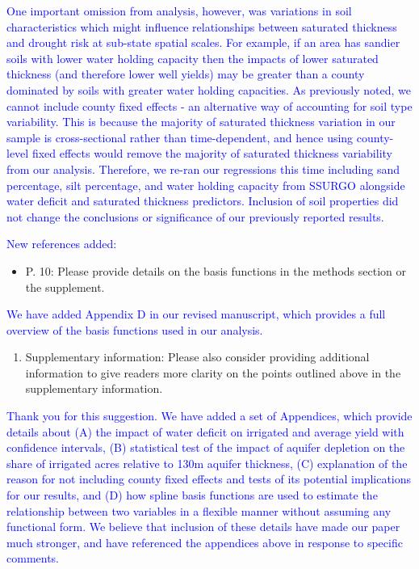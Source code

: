 \documentclass[
]{article}
\providecommand{\tightlist}{%
  \setlength{\itemsep}{0pt}\setlength{\parskip}{0pt}}
\begin{document}
\textcolor{blue}{One important omission from analysis, however, was variations in soil characteristics which might influence relationships between saturated thickness and drought risk at sub-state spatial scales. For example, if an area has sandier soils with lower water holding capacity then the impacts of lower saturated thickness (and therefore lower well yields) may be greater than a county dominated by soils with greater water holding capacities. As previously noted, we cannot include county fixed effects - an alternative way of accounting for soil type variability. This is because the majority of saturated thickness variation in our sample is cross-sectional rather than time-dependent, and hence using county-level fixed effects would remove the majority of saturated thickness variability from our analysis. Therefore, we re-ran our regressions this time including sand percentage, silt percentage, and water holding capacity from SSURGO alongside water deficit and saturated thickness predictors. Inclusion of soil properties did not change the conclusions or significance of our previously reported results.}

\textcolor{blue}{New references added:}

\textcolor{blue}{}

\begin{itemize}
\tightlist
\item
  P. 10: Please provide details on the basis functions in the methods
  section or the supplement.
\end{itemize}

\textcolor{blue}{We have added Appendix D in our revised manuscript, which provides a full overview of the basis functions used in our analysis.}

\begin{enumerate}
\def\labelenumi{\arabic{enumi}.}
\setcounter{enumi}{7}
\tightlist
\item
  Supplementary information: Please also consider providing additional
  information to give readers more clarity on the points outlined above
  in the supplementary information.
\end{enumerate}

\textcolor{blue}{Thank you for this suggestion. We have added a set of Appendices, which provide details about (A) the impact of water deficit on irrigated and average yield with confidence intervals, (B) statistical test of the impact of aquifer depletion on the share of irrigated acres relative to 130m aquifer thickness, (C) explanation of the reason for not including county fixed effects and tests of its potential implications for our results, and (D) how spline basis functions are used to estimate the relationship between two variables in a flexible manner without assuming any functional form. We believe that inclusion of these details have made our paper much stronger, and have referenced the appendices above in response to specific comments.}
\end{document}
